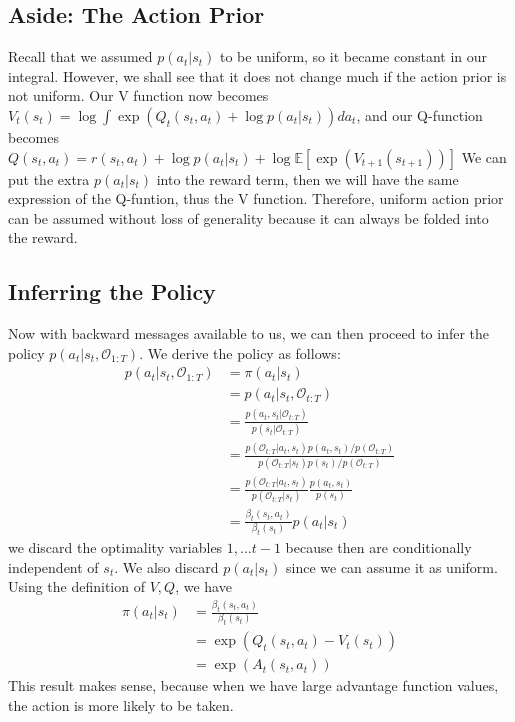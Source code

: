 \subsection{Aside: The Action Prior}
Recall that we assumed $p(a_t|s_t)$ to be uniform, so it became constant in our integral. However, we shall see that it does not change much if the action prior is not uniform. Our V function now becomes $V_t(s_t) = \log \int \exp (Q_t(s_t,a_t)+\log p(a_t|s_t))da_t$, and our Q-function becomes $Q(s_t,a_t) = r(s_t,a_t) + \log p(a_t|s_t) + \log \mathbb{E}[\exp (V_{t+1}(s_{t+1}))]$
We can put the extra $p(a_t|s_t)$ into the reward term, then we will have the same expression of the Q-funtion, thus the V function. Therefore, uniform action prior can be assumed without loss of generality because it can always be folded into the reward.

\subsection{Inferring the Policy}
Now with backward messages available to us, we can then proceed to infer the policy $p(a_t|s_t,\mathcal{O}_{1:T})$. We derive the policy as follows:
\begin{align*}
    p(a_t|s_t,\mathcal{O}_{1:T}) &= \pi(a_t|s_t)\\
    &= p(a_t|s_t,\mathcal{O}_{t:T})\\
    &= \frac{p(a_t,s_t|\mathcal{O}_{t:T})}{p(s_t|\mathcal{O}_{t:T})}\\
    &= \frac{p(\mathcal{O}_{t:T}|a_t,s_t)p(a_t,s_t)/p(\mathcal{O}_{t:T})}{p(\mathcal{O}_{t:T}|s_t)p(s_t)/p(\mathcal{O}_{t:T})}\\
    &= \frac{p(\mathcal{O}_{t:T}|a_t,s_t)}{p(\mathcal{O}_{t:T}|s_t)}\frac{p(a_t,s_t)}{p(s_t)}\\
    &= \frac{\beta_t(s_t,a_t)}{\beta_t(s_t)}p(a_t|s_t)
\end{align*}
we discard the optimality variables $1,\dots t-1$ because then are conditionally independent of $s_t$. We also discard $p(a_t|s_t)$ since we can assume it as uniform. Using the definition of $V,Q$, we have
\begin{align*}
    \pi(a_t|s_t)&= \frac{\beta_t(s_t,a_t)}{\beta_t(s_t)}\\
    &= \exp(Q_t(s_t,a_t) - V_t(s_t))\\
    &= \exp(A_t(s_t,a_t))
\end{align*}
This result makes sense, because when we have large advantage function values, the action is more likely to be taken.

